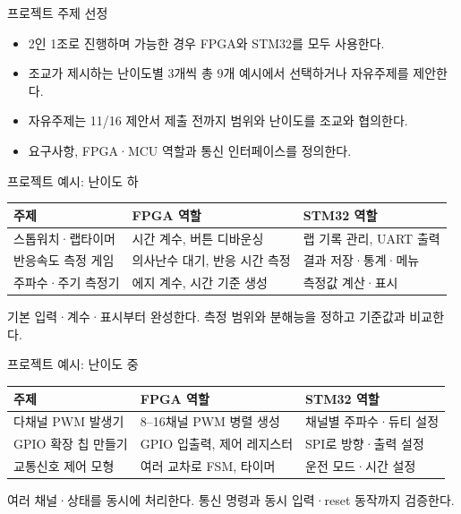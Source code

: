 \documentclass[aspectratio=169,11pt,t]{beamer}
\begin{document}
\begin{frame}{프로젝트 주제 선정}
\begin{itemize}
\item 2인 1조로 진행하며 가능한 경우 FPGA와 STM32를 모두 사용한다.
\item 조교가 제시하는 난이도별 3개씩 총 9개 예시에서 선택하거나 자유주제를 제안한다.
\item 자유주제는 11/16 제안서 제출 전까지 범위와 난이도를 조교와 협의한다.
\item 요구사항, FPGA·MCU 역할과 통신 인터페이스를 정의한다.
\end{itemize}
\end{frame}

\begin{frame}{프로젝트 예시: 난이도 하}
\footnotesize
\setlength{\tabcolsep}{5pt}\renewcommand{\arraystretch}{1.65}
\begin{tabular}{@{}p{3.8cm}p{4.4cm}p{4.2cm}@{}}
\textbf{주제} & \textbf{FPGA 역할} & \textbf{STM32 역할}\\\hline
스톱워치·랩타이머 & 시간 계수, 버튼 디바운싱 & 랩 기록 관리, UART 출력\\
반응속도 측정 게임 & 의사난수 대기, 반응 시간 측정 & 결과 저장·통계·메뉴\\
주파수·주기 측정기 & 에지 계수, 시간 기준 생성 & 측정값 계산·표시\\
\end{tabular}
\par\vspace{0.4cm}\small
기본 입력·계수·표시부터 완성한다. 측정 범위와 분해능을 정하고 기준값과 비교한다.
\end{frame}

\begin{frame}{프로젝트 예시: 난이도 중}
\footnotesize
\setlength{\tabcolsep}{5pt}\renewcommand{\arraystretch}{1.65}
\begin{tabular}{@{}p{3.8cm}p{4.4cm}p{4.2cm}@{}}
\textbf{주제} & \textbf{FPGA 역할} & \textbf{STM32 역할}\\\hline
다채널 PWM 발생기 & 8--16채널 PWM 병렬 생성 & 채널별 주파수·듀티 설정\\
GPIO 확장 칩 만들기 & GPIO 입출력, 제어 레지스터 & SPI로 방향·출력 설정\\
교통신호 제어 모형 & 여러 교차로 FSM, 타이머 & 운전 모드·시간 설정\\
\end{tabular}
\par\vspace{0.4cm}\small
여러 채널·상태를 동시에 처리한다. 통신 명령과 동시 입력·reset 동작까지 검증한다.
\end{frame}
\end{document}
